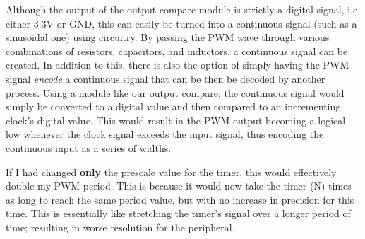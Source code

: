 \documentclass[a4paper, 12pt]{article}
\begin{document}
Although the output of the output compare module is strictly a digital signal, i.e. either 3.3V or GND, this can easily be turned into a continuous signal (such as a sinusoidal one) using circuitry. By passing the PWM wave through various combinations of resistors, capacitors, and inductors, a continuous signal can be created. In addition to this, there is also the option of simply having the PWM signal \textit{encode} a continuous signal that can be then be decoded by another process. Using a module like our output compare, the continuous signal would simply be converted to a digital value and then compared to an incrementing clock's digital value. This would result in the PWM output becoming a logical low whenever the clock signal exceeds the input signal, thus encoding the continuous input as a series of widths.

If I had changed \textbf{only} the prescale value for the timer, this would effectively double my PWM period. This is because it would now take the timer (N) times as long to reach the same period value, but with no increase in precision for this time. This is essentially like stretching the timer's signal over a longer period of time; resulting in worse resolution for the peripheral.
\end{document}
